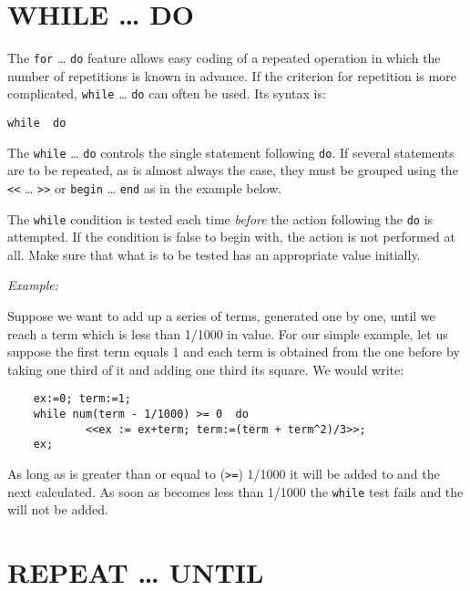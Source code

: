 \section{WHILE \ldots{} DO}
\hypertarget{command:WHILE}{}

The \texttt{for} \ldots{} \texttt{do} feature
allows easy coding of a repeated operation in which the number of repetitions
is known in advance.  If the criterion for repetition is more complicated,
\texttt{while} \ldots{} \texttt{do} can often be used.  Its syntax is:
\begin{syntax}
  \texttt{while }\texttt{ do }
\end{syntax}
The \texttt{while} \ldots{} \texttt{do} controls the single statement
following \texttt{do}.
If several statements are to be repeated, as is almost always the case,
they must be grouped using the \texttt{<}\texttt{<} \ldots{} \texttt{>}\texttt{>}
or \texttt{begin} \ldots{} \texttt{end}
as in the example below.

The \texttt{while} condition is tested each time \emph{before} the action
following the \texttt{do} is attempted.  If the condition is false to begin
with, the action is not performed at all.  Make sure that what is to be
tested has an appropriate value initially.

\textit{Example:}

Suppose we want to add up a series of terms, generated one by one, until
we reach a term which is less than 1/1000 in value.  For our simple
example, let us suppose the first term equals 1 and each term is obtained
from the one before by taking one third of it and adding one third its
square. We would write:
\begin{verbatim}
    ex:=0; term:=1;
    while num(term - 1/1000) >= 0  do
            <<ex := ex+term; term:=(term + term^2)/3>>;
    ex;
\end{verbatim}
As long as  is greater than or equal to (\texttt{>=}) 1/1000 it will
be added to  and the next  calculated.  As soon as
 becomes less than 1/1000 the \texttt{while} test fails and the
 will not be added.


\section{REPEAT \ldots{} UNTIL}
\hypertarget{command:REPEAT}{}
\hypertarget{reserved:UNTIL}{}

